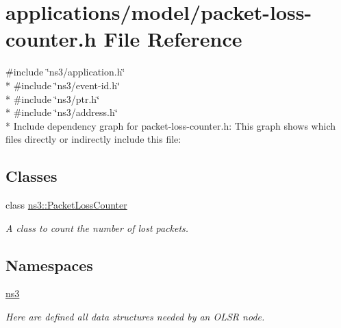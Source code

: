 \hypertarget{packet-loss-counter_8h}{}\section{applications/model/packet-\/loss-\/counter.h File Reference}
\label{packet-loss-counter_8h}
{\ttfamily \#include \char`\"{}ns3/application.\+h\char`\"{}}\\*
{\ttfamily \#include \char`\"{}ns3/event-\/id.\+h\char`\"{}}\\*
{\ttfamily \#include \char`\"{}ns3/ptr.\+h\char`\"{}}\\*
{\ttfamily \#include \char`\"{}ns3/address.\+h\char`\"{}}\\*
Include dependency graph for packet-\/loss-\/counter.h\+:
This graph shows which files directly or indirectly include this file\+:
\subsection*{Classes}
\begin{DoxyCompactItemize}
\item 
class \hyperlink{classns3_1_1PacketLossCounter}{ns3\+::\+Packet\+Loss\+Counter}
\begin{DoxyCompactList}\small\item\em A class to count the number of lost packets. \end{DoxyCompactList}\end{DoxyCompactItemize}
\subsection*{Namespaces}
\begin{DoxyCompactItemize}
\item 
 \hyperlink{namespacens3}{ns3}
\begin{DoxyCompactList}\small\item\em Here are defined all data structures needed by an O\+L\+SR node. \end{DoxyCompactList}\end{DoxyCompactItemize}
